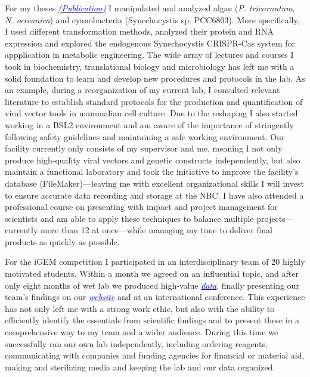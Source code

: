 \documentclass[11pt,a4paper,sans]{moderncv}
\begin{document}
\begin{spacing}{1.15}
For my theses {\href{https://www.ncbi.nlm.nih.gov/pubmed/29517395}{\textcolor{blue}{{\textit{(Publication)}}}}} I manipulated and analyzed algae (\textit{P. tricornutum}, \textit{N. ocecanica}) and cyanobacteria (Synechocystis sp. PCC6803). 
More specifically, I used different transformation methods, analyzed their protein and RNA expression and explored the endogenous Synechocystis CRISPR-Cas system for appplication in metabolic engineering. 
The wide array of lectures and courses I took in biochemistry, translational biology and microbiology has  left me with a solid foundation to learn and develop new procedures and protocols in the lab. 
As an example, during a reorganization of my current lab, I consulted relevant literature to establish standard protocols for the production and quantification of viral vector tools in mammalian cell culture. 
Due to the reshaping I also started working in a BSL2 environment and am aware of the importance of stringently following safety guidelines and maintaining a safe working environment. 
Our facility currently only consists of my supervisor and me, meaning I not only produce high-quality viral vectors and genetic constructs independently, but also maintain a functional laboratory and took the initiative to improve the facility's database (FileMaker)---leaving me with excellent organizational skills I will invest to ensure accurate data recording and storage at the NBC.  
I have also attended a professional course on presenting with impact and project management for scientists and am able to apply these techniques to balance multiple projects---currently more than 12 at once---while managing my time to deliver final products as quickly as possible.  \par%

For the iGEM competition I participated in an interdisciplinary team of 20 highly motivated students.
Within a month we agreed on an influential topic, and after only eight months of wet lab we produced high-value  {\href{https://www.ncbi.nlm.nih.gov/pubmed/29803867}{\textcolor{blue}{\textit{data}}}}, finally presenting our team's findings on our {\href{http://2015.igem.org/Team:Freiburg}{\textcolor{blue}{\textit{website}}}} and at an international conference. 
This experience has not only left me with a strong work ethic, but also with the ability to efficiently identify the essentials from scientific findings and to present these in a comprehensive way to my team and a wider audience. 
During this time we successfully ran our own lab independently, including ordering reagents, communicating with companies and funding agencies for financial or material aid, making and sterilizing media and keeping the lab and our data organized. \par


\end{spacing}
\end{document}
